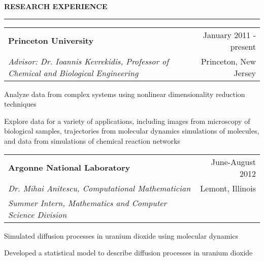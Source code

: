 \documentclass[letterpaper,10pt]{article}
\makeatletter
\newenvironment{itemize*}
  {\begin{itemize}
    \setlength{\parskip}{-3pt}}
  {\end{itemize}}
\newcommand{\cvheading}[1]{
\vspace{0.05in}
\noindent
\MakeUppercase{\bf #1}
\vspace{0.06in}
{\hrule height 0.3mm}
\vspace{0.06in}}
\newcommand{\workplace}[4]{
\noindent
\begin{tabular*}{1.0\textwidth}{@{\extracolsep{\fill}} l r}
{\bf #1} & #2\\
{\em #3} & #4\\
\end{tabular*}
}
\newcommand{\workplaceadvisor}[5]{
\noindent
\begin{tabular*}{1.0\textwidth}{@{\extracolsep{\fill}} l r}
{\bf #1} & #2\\
{\em #3} & #4\\
{\em #5} & \\
\end{tabular*}
}
\makeatother
\begin{document}
\cvheading{Research Experience}
\workplace{Princeton University}{January 2011 - present}{Advisor: Dr. Ioannis Kevrekidis, Professor of Chemical and Biological Engineering}{Princeton, New Jersey}
\begin{itemize*}
\item Analyze data from complex systems using nonlinear dimensionality reduction techniques%
\item Explore data for a variety of applications, including images from microscopy of biological samples, trajectories from molecular dynamics simulations of molecules, and data from simulations of chemical reaction networks
\end{itemize*}

\workplaceadvisor{Argonne National Laboratory}{June-August 2012}{Dr. Mihai Anitescu, Computational Mathematician}{Lemont, Illinois}{Summer Intern, Mathematics and Computer Science Division}
\begin{itemize*}
\item Simulated diffusion processes in uranium dioxide using molecular dynamics
\item Developed a statistical model to describe diffusion processes in uranium dioxide
\end{itemize*}

\end{document}
